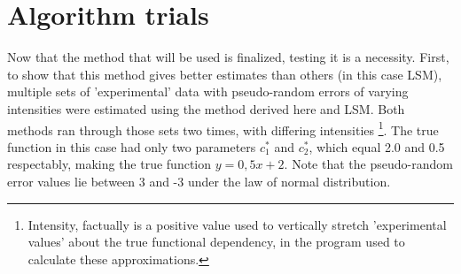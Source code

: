 \section{Algorithm trials}
Now that the method that will be used is finalized, testing it is a necessity. First, to show that this method gives better estimates than others (in this case LSM), multiple sets of 'experimental' data with pseudo-random errors of varying intensities were estimated using the method derived here and LSM. Both methods ran through those sets two times, with differing intensities \footnote{Intensity, factually is a positive value used to vertically stretch 'experimental values' about the true functional dependency, in the program used to calculate these approximations.}. The true function in this case had only two parameters $c_{1}^{*}$ and $c_{2}^{*}$, which equal 2.0 and 0.5 respectably, making the true function $y=0,5x + 2$. Note that the pseudo-random error values lie between 3 and -3 under the law of normal distribution.
